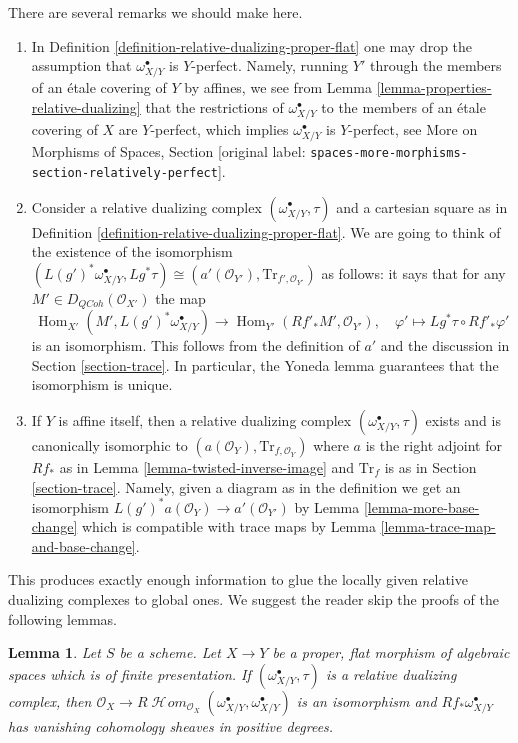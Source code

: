 \documentclass[10pt,a4paper]{article}
\theoremstyle{plain}
\newtheorem{lemma}[subsection]{Lemma}
\theoremstyle{definition}
\theoremstyle{remark}
\numberwithin{equation}{subsection}
\def\Hom{\mathop{\mathrm{Hom}}\nolimits}
\def\SheafHom{\mathop{\mathcal{H}\!\mathit{om}}\nolimits}
\def\QCoh{\mathit{QCoh}}
\begin{document}
\noindent
There are several remarks we should make here.
\begin{enumerate}
\item In Definition \ref{definition-relative-dualizing-proper-flat}
one may drop the assumption that $\omega_{X/Y}^\bullet$ is $Y$-perfect.
Namely, running $Y'$ through the members of an \'etale covering of $Y$
by affines, we see from Lemma \ref{lemma-properties-relative-dualizing}
that the restrictions of $\omega_{X/Y}^\bullet$ to the members of
an \'etale covering of $X$ are $Y$-perfect, which implies
$\omega_{X/Y}^\bullet$ is $Y$-perfect, see
More on Morphisms of Spaces, Section
\textnormal{[original label: \nolinkurl{spaces-more-morphisms-section-relatively-perfect}]}.
\item Consider a relative dualizing complex
$(\omega_{X/Y}^\bullet, \tau)$ and a cartesian square as in
Definition \ref{definition-relative-dualizing-proper-flat}.
We are going to think of the existence of the isomorphism
$(L(g')^*\omega_{X/Y}^\bullet, Lg^*\tau) \cong
(a'(\mathcal{O}_{Y'}), \text{Tr}_{f', \mathcal{O}_{Y'}})$
as follows: it says that for any $M' \in D_\QCoh(\mathcal{O}_{X'})$
the map
$$
\Hom_{X'}(M', L(g')^*\omega_{X/Y}^\bullet)
\longrightarrow
\Hom_{Y'}(Rf'_*M', \mathcal{O}_{Y'}),\quad
\varphi' \longmapsto Lg^*\tau \circ Rf'_*\varphi'
$$
is an isomorphism. This follows from the definition of $a'$
and the discussion in Section \ref{section-trace}. In particular,
the Yoneda lemma guarantees that the isomorphism is unique.
\item If $Y$ is affine itself, then a relative dualizing complex
$(\omega_{X/Y}^\bullet, \tau)$ exists and is canonically isomorphic
to $(a(\mathcal{O}_Y), \text{Tr}_{f, \mathcal{O}_Y})$ where
$a$ is the right adjoint for $Rf_*$ as in
Lemma \ref{lemma-twisted-inverse-image}
and $\text{Tr}_f$ is as in Section \ref{section-trace}.
Namely, given a diagram as in the definition we get
an isomorphism $L(g')^*a(\mathcal{O}_Y) \to a'(\mathcal{O}_{Y'})$ by
Lemma \ref{lemma-more-base-change}
which is compatible with trace maps by
Lemma \ref{lemma-trace-map-and-base-change}.
\end{enumerate}
This produces exactly enough information to glue the locally given
relative dualizing complexes to global ones. We suggest the reader
skip the proofs of the following lemmas.

\begin{lemma}
\label{lemma-relative-dualizing-RHom}
Let $S$ be a scheme. Let $X \to Y$ be a proper, flat morphism of
algebraic spaces which is of finite presentation.
If $(\omega_{X/Y}^\bullet, \tau)$ is a relative dualizing complex,
then  $\mathcal{O}_X \to
R\SheafHom_{\mathcal{O}_X}(\omega_{X/Y}^\bullet, \omega_{X/Y}^\bullet)$
is an isomorphism and $Rf_*\omega_{X/Y}^\bullet$ has vanishing cohomology
sheaves in positive degrees.
\end{lemma}
\end{document}
